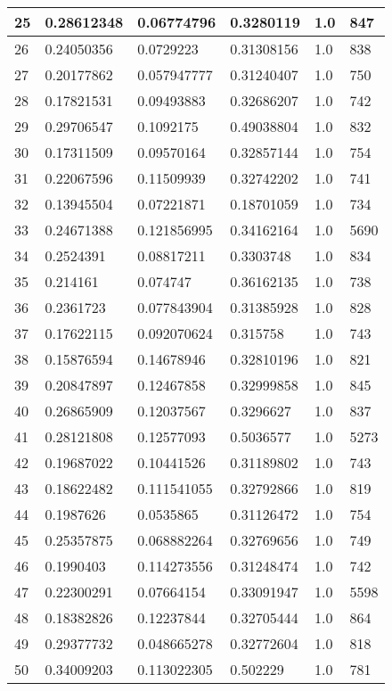 \begin{longtable}{|l|l|l|l|l|l|}
25 & 0.28612348 & 0.06774796 & 0.3280119 & 1.0 & 847 \\ \hline 
26 & 0.24050356 & 0.0729223 & 0.31308156 & 1.0 & 838 \\ \hline 
27 & 0.20177862 & 0.057947777 & 0.31240407 & 1.0 & 750 \\ \hline 
28 & 0.17821531 & 0.09493883 & 0.32686207 & 1.0 & 742 \\ \hline 
29 & 0.29706547 & 0.1092175 & 0.49038804 & 1.0 & 832 \\ \hline 
30 & 0.17311509 & 0.09570164 & 0.32857144 & 1.0 & 754 \\ \hline 
31 & 0.22067596 & 0.11509939 & 0.32742202 & 1.0 & 741 \\ \hline 
32 & 0.13945504 & 0.07221871 & 0.18701059 & 1.0 & 734 \\ \hline 
33 & 0.24671388 & 0.121856995 & 0.34162164 & 1.0 & 5690 \\ \hline 
34 & 0.2524391 & 0.08817211 & 0.3303748 & 1.0 & 834 \\ \hline 
35 & 0.214161 & 0.074747 & 0.36162135 & 1.0 & 738 \\ \hline 
36 & 0.2361723 & 0.077843904 & 0.31385928 & 1.0 & 828 \\ \hline 
37 & 0.17622115 & 0.092070624 & 0.315758 & 1.0 & 743 \\ \hline 
38 & 0.15876594 & 0.14678946 & 0.32810196 & 1.0 & 821 \\ \hline 
39 & 0.20847897 & 0.12467858 & 0.32999858 & 1.0 & 845 \\ \hline 
40 & 0.26865909 & 0.12037567 & 0.3296627 & 1.0 & 837 \\ \hline 
41 & 0.28121808 & 0.12577093 & 0.5036577 & 1.0 & 5273 \\ \hline 
42 & 0.19687022 & 0.10441526 & 0.31189802 & 1.0 & 743 \\ \hline 
43 & 0.18622482 & 0.111541055 & 0.32792866 & 1.0 & 819 \\ \hline 
44 & 0.1987626 & 0.0535865 & 0.31126472 & 1.0 & 754 \\ \hline 
45 & 0.25357875 & 0.068882264 & 0.32769656 & 1.0 & 749 \\ \hline 
46 & 0.1990403 & 0.114273556 & 0.31248474 & 1.0 & 742 \\ \hline 
47 & 0.22300291 & 0.07664154 & 0.33091947 & 1.0 & 5598 \\ \hline 
48 & 0.18382826 & 0.12237844 & 0.32705444 & 1.0 & 864 \\ \hline 
49 & 0.29377732 & 0.048665278 & 0.32772604 & 1.0 & 818 \\ \hline 
50 & 0.34009203 & 0.113022305 & 0.502229 & 1.0 & 781 \\ \hline 
\end{longtable}